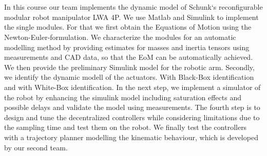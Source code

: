 \chapter{\abstractname}


In this course our team implements the dynamic model of Schunk`s  reconfigurable modular robot manipulator LWA 4P. We use Matlab and Simulink to implement the single modules. For that we first obtain the Equations of Motion using the Newton-Euler-formulation. We characterize the modules for an automatic modelling method by providing estimates for masses and inertia tensors using measurements and CAD data, so that the EoM can be automatically achieved. We then provide the preliminary Simulink model for the robotic arm.  Secondly, we identify the dynamic modell of the actuators. With Black-Box identification and with White-Box identification. In the next step, we implement a simulator of the robot by enhancing the simulink model including saturation effects and possible delays and validate the model using measurements. The fourth step is to design and tune the decentralized controllers while considering limitations due to the sampling time and test them on the robot. We finally test the controllers with a trajectory planner modelling the kinematic behaviour, which is developed by our second team.

